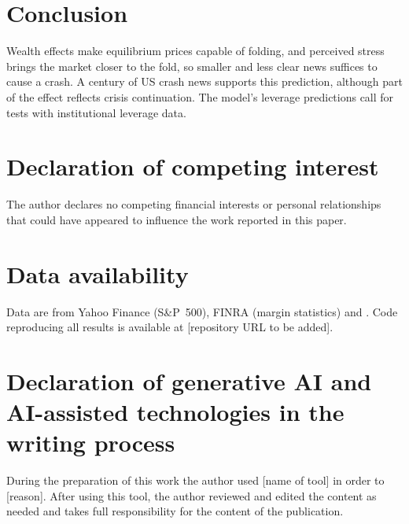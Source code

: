 \documentclass[11pt,a4paper]{article}
\begin{document}
\section{Conclusion}

Wealth effects make equilibrium prices capable of folding, and perceived stress brings the
market closer to the fold, so smaller and less clear news suffices to cause a crash. A century
of US crash news supports this prediction, although part of the effect reflects crisis
continuation. The model's leverage predictions call for tests with institutional leverage
data.

\section*{Declaration of competing interest}
The author declares no competing financial interests or personal relationships that could
have appeared to influence the work reported in this paper.

\section*{Data availability}
Data are from Yahoo Finance (S\&P~500), FINRA (margin statistics) and \citet{BBDS2021}.
Code reproducing all results is available at [repository URL to be added].

\section*{Declaration of generative AI and AI-assisted technologies in the writing process}
During the preparation of this work the author used [name of tool] in order to [reason].
After using this tool, the author reviewed and edited the content as needed and takes full
responsibility for the content of the publication.
\end{document}
